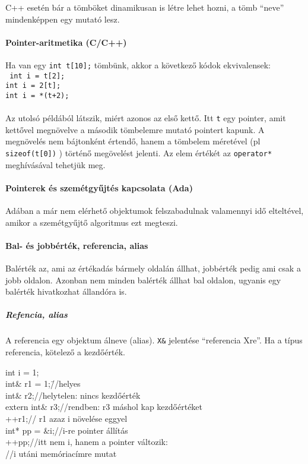 \documentclass[fleqn,10pt,a4paper]{article}
\newcommand{\ut}[1]{\texttt{#1}}
\theoremstyle{magyar}
\begin{document}
  C++ esetén bár a tömböket dinamikusan is létre lehet hozni, a tömb
  ``neve'' mindenképpen egy mutató lesz. 
    
  \paragraph{Pointer-aritmetika (C/C++)}
  Ha van egy \ut{int t[10];} tömbünk,
  akkor a következő kódok ekvivalensek:\\
  \ut{
    int i = t[2];\\
    int i = 2[t];\\
    int i = *(t+2);\\}\\
  Az utolsó példából látszik, miért azonos az első kettő. Itt \ut{t}
  egy pointer, amit kettővel megnövelve a második tömbelemre mutató
  pointert kapunk. A megnövelés nem bájtonként értendő, hanem a
  tömbelem méretével (pl \ut{sizeof(t[0])} ) történő megövelést
  jelenti. Az elem értékét az \ut{operator*} meghívásával tehetjük
  meg.

  \paragraph{Pointerek és szemétgyűjtés kapcsolata (Ada)}
  Adában a már nem elérhető objektumok felszabadulnak valamennyi idő
  elteltével, amikor a szemétgyűjtő algoritmus ezt megteszi.
  \paragraph{Bal- és jobbérték, referencia, alias}
  Balérték az, ami az értékadás bármely oldalán állhat, jobbérték
  pedig ami csak a jobb oldalon. Azonban nem minden balérték állhat
  bal oldalon, ugyanis egy balérték hivatkozhat állandóra is.

  \subparagraph{Refencia, alias} A referencia egy objektum álneve
  (alias). \ut{X\&} jelentése ``referencia X\-re''. Ha a típus
  referencia, kötelező a kezdőérték.\\
  \begin{tabbing}
      int i = 1;\\
      int\& r1 = 1;\qquad\qquad\=//helyes\\
      int\& r2;\>//helytelen: nincs kezdőérték\\
      extern int\& r3;\>//rendben: r3 máshol kap kezdőértéket\\
      ++r1;\>// r1 azaz i növelése eggyel\\
      int* pp = \&i;\>//i-re pointer állítás\\
      ++pp;\>//itt nem i, hanem a pointer változik:\\
      \>//i utáni memóriacímre mutat
    \end{tabbing} 
  
\end{document}
